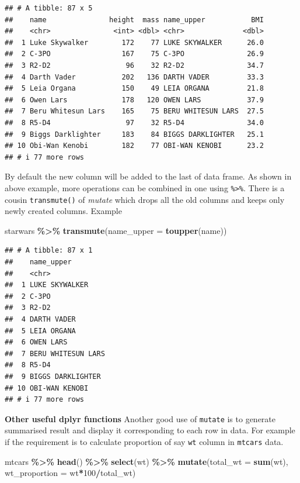 \documentclass[
]{book}
\newenvironment{Shaded}{\begin{snugshade}}{\end{snugshade}}
\newcommand{\AttributeTok}[1]{\textcolor[rgb]{0.13,0.29,0.53}{#1}}
\newcommand{\DecValTok}[1]{\textcolor[rgb]{0.00,0.00,0.81}{#1}}
\newcommand{\FunctionTok}[1]{\textcolor[rgb]{0.13,0.29,0.53}{\textbf{#1}}}
\newcommand{\NormalTok}[1]{#1}
\newcommand{\SpecialCharTok}[1]{\textcolor[rgb]{0.81,0.36,0.00}{\textbf{#1}}}
\begin{document}
\begin{verbatim}
## # A tibble: 87 x 5
##    name               height  mass name_upper           BMI
##    <chr>               <int> <dbl> <chr>              <dbl>
##  1 Luke Skywalker        172    77 LUKE SKYWALKER      26.0
##  2 C-3PO                 167    75 C-3PO               26.9
##  3 R2-D2                  96    32 R2-D2               34.7
##  4 Darth Vader           202   136 DARTH VADER         33.3
##  5 Leia Organa           150    49 LEIA ORGANA         21.8
##  6 Owen Lars             178   120 OWEN LARS           37.9
##  7 Beru Whitesun Lars    165    75 BERU WHITESUN LARS  27.5
##  8 R5-D4                  97    32 R5-D4               34.0
##  9 Biggs Darklighter     183    84 BIGGS DARKLIGHTER   25.1
## 10 Obi-Wan Kenobi        182    77 OBI-WAN KENOBI      23.2
## # i 77 more rows
\end{verbatim}

By default the new column will be added to the last of data frame. As shown in above example, more operations can be combined in one using \texttt{\%\textgreater{}\%}. There is a cousin \texttt{transmute()} of \emph{mutate} which drops all the old columns and keeps only newly created columns. Example

\begin{Shaded}
\begin{Highlighting}[]
\NormalTok{starwars }\SpecialCharTok{\%\textgreater{}\%} 
  \FunctionTok{transmute}\NormalTok{(}\AttributeTok{name\_upper =} \FunctionTok{toupper}\NormalTok{(name))}
\end{Highlighting}
\end{Shaded}

\begin{verbatim}
## # A tibble: 87 x 1
##    name_upper        
##    <chr>             
##  1 LUKE SKYWALKER    
##  2 C-3PO             
##  3 R2-D2             
##  4 DARTH VADER       
##  5 LEIA ORGANA       
##  6 OWEN LARS         
##  7 BERU WHITESUN LARS
##  8 R5-D4             
##  9 BIGGS DARKLIGHTER 
## 10 OBI-WAN KENOBI    
## # i 77 more rows
\end{verbatim}

\textbf{Other useful dplyr functions} Another good use of \texttt{mutate} is to generate summarised result and display it corresponding to each row in data. For example if the requirement is to calculate proportion of say \texttt{wt} column in \texttt{mtcars} data.

\begin{Shaded}
\begin{Highlighting}[]
\NormalTok{mtcars }\SpecialCharTok{\%\textgreater{}\%} 
  \FunctionTok{head}\NormalTok{() }\SpecialCharTok{\%\textgreater{}\%} 
  \FunctionTok{select}\NormalTok{(wt) }\SpecialCharTok{\%\textgreater{}\%} 
  \FunctionTok{mutate}\NormalTok{(}\AttributeTok{total\_wt =} \FunctionTok{sum}\NormalTok{(wt),}
         \AttributeTok{wt\_proportion =}\NormalTok{ wt}\SpecialCharTok{*}\DecValTok{100}\SpecialCharTok{/}\NormalTok{total\_wt) }
\end{Highlighting}
\end{Shaded}
\end{document}
